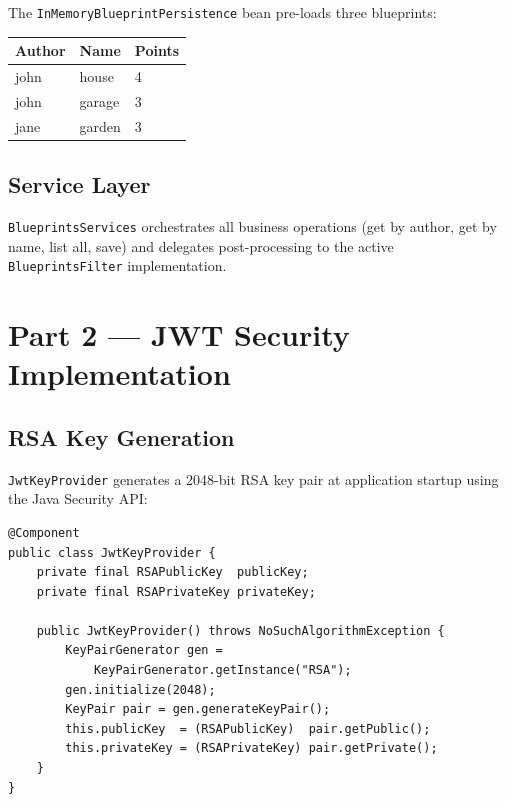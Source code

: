 \documentclass[10pt,a4paper,twocolumn]{article}
\begin{document}
The \texttt{InMemoryBlueprintPersistence} bean pre-loads three blueprints:

\begin{center}
\small
\begin{tabular}{@{}lll@{}}
\toprule
\textbf{Author} & \textbf{Name} & \textbf{Points} \\
\midrule
john & house   & 4 \\
john & garage  & 3 \\
jane & garden  & 3 \\
\bottomrule
\end{tabular}
\end{center}

\subsection{Service Layer}

\texttt{BlueprintsServices} orchestrates all business operations (get by
author, get by name, list all, save) and delegates post-processing to the
active \texttt{BlueprintsFilter} implementation.

\section{Part 2 --- JWT Security Implementation}

\subsection{RSA Key Generation}

\texttt{JwtKeyProvider} generates a 2048-bit RSA key pair at application
startup using the Java Security API:

\begin{lstlisting}[style=javacode, caption={JwtKeyProvider key generation}]
@Component
public class JwtKeyProvider {
    private final RSAPublicKey  publicKey;
    private final RSAPrivateKey privateKey;

    public JwtKeyProvider() throws NoSuchAlgorithmException {
        KeyPairGenerator gen =
            KeyPairGenerator.getInstance("RSA");
        gen.initialize(2048);
        KeyPair pair = gen.generateKeyPair();
        this.publicKey  = (RSAPublicKey)  pair.getPublic();
        this.privateKey = (RSAPrivateKey) pair.getPrivate();
    }
}
\end{lstlisting}
\end{document}
